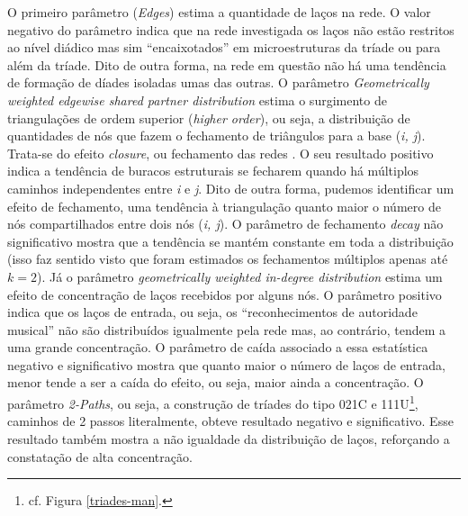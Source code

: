 \documentclass[a4paper, 12pt, openright, oneside, german, french, english, brazil]{abntex2}
\begin{document}
	
	O primeiro parâmetro (\textit{Edges}) estima a quantidade de laços na rede. O valor negativo do parâmetro indica que na rede investigada os laços não estão restritos ao nível diádico mas sim ``encaixotados'' em microestruturas da tríade ou para além da tríade. Dito de outra forma, na rede em questão não há uma tendência de formação de díades isoladas umas das outras. O parâmetro \textit{Geometrically weighted edgewise shared partner distribution} estima o surgimento de triangulações de ordem superior (\textit{higher order}), ou seja, a distribuição de quantidades de nós que fazem o fechamento de triângulos para a base (\textit{i, j}). Trata-se do efeito \textit{closure}, ou fechamento das redes \cite{robins2007introduction}. O seu resultado positivo indica a tendência de buracos estruturais se fecharem quando há múltiplos caminhos independentes entre \textit{i} e \textit{j}. Dito de outra forma, pudemos identificar um efeito de fechamento, uma tendência à triangulação quanto maior o número de nós compartilhados entre dois nós (\textit{i, j}). O parâmetro de fechamento \textit{decay} não significativo mostra que a tendência se mantém constante em toda a distribuição (isso faz sentido visto que foram estimados os fechamentos múltiplos apenas até $k = 2$). Já o parâmetro \textit{geometrically weighted in-degree distribution} estima um efeito de concentração de laços recebidos por alguns nós. O parâmetro positivo indica que os laços de entrada, ou seja, os ``reconhecimentos de autoridade musical'' não são distribuídos igualmente pela rede mas, ao contrário, tendem a uma grande concentração. O parâmetro de caída associado a essa estatística negativo e significativo mostra que quanto maior o número de laços de entrada, menor tende a ser a caída do efeito, ou seja, maior ainda a concentração. O parâmetro \textit{2-Paths}, ou seja, a construção de tríades do tipo 021C e 111U\footnote{cf. Figura \ref{triades-man}.}, caminhos de 2 passos literalmente, obteve resultado negativo e significativo. Esse resultado também mostra a não igualdade da distribuição de laços, reforçando a constatação de alta concentração.
	
\end{document}
